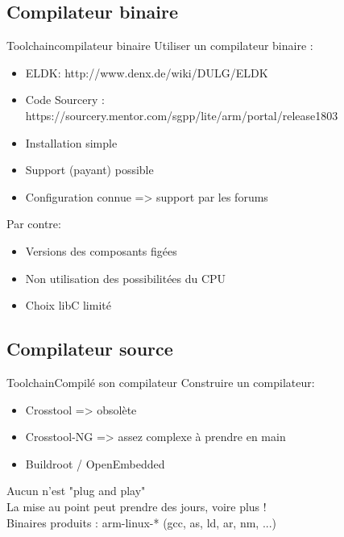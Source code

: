 \subsection{Compilateur binaire}
\begin{frame}{Toolchain}{compilateur binaire}
	Utiliser un compilateur binaire :
	\begin{itemize}
		\item
			ELDK: http://www.denx.de/wiki/DULG/ELDK
		\item
			Code Sourcery : https://sourcery.mentor.com/sgpp/lite/arm/portal/release1803
		\item
			Installation simple
		\item
			Support (payant) possible
		\item
			Configuration connue => support par les forums
	\end{itemize}
	Par contre:
	\begin{itemize}
		\item
			Versions des composants figées
		\item
			Non utilisation des possibilitées du CPU
		\item
			Choix libC limité
	\end{itemize}
\end{frame}

\subsection{Compilateur source}
\begin{frame}{Toolchain}{Compilé son compilateur}
	Construire un compilateur:
	\begin{itemize}
		\item
			Crosstool => obsolète
		\item
			Crosstool-NG => assez complexe à prendre en main
		\item
			Buildroot / OpenEmbedded
	\end{itemize}
	Aucun n'est "plug and play"\\
	La mise au point peut prendre des jours, voire plus !\\
	Binaires produits : arm-linux-* (gcc, as, ld, ar, nm, ...)\\
\end{frame}

